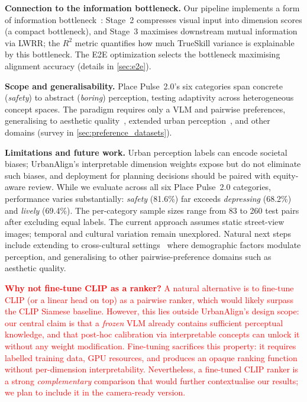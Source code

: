\documentclass[runningheads]{llncs}
\begin{document}
\smallskip\noindent\textbf{Connection to the information bottleneck.}
Our pipeline implements a form of information bottleneck~\cite{tishby2000information}: Stage~2 compresses visual input into dimension scores (a compact bottleneck), and Stage~3 maximises downstream mutual information via LWRR; the $R^{2}$ metric quantifies how much TrueSkill variance is explainable by this bottleneck.
The E2E optimization selects the bottleneck maximising alignment accuracy (details in \cref{sec:e2e}).

\smallskip\noindent\textbf{Scope and generalisability.}
Place Pulse~2.0's six categories span concrete (\emph{safety}) to abstract (\emph{boring}) perception, testing adaptivity across heterogeneous concept spaces.
The paradigm requires only a VLM and pairwise preferences, generalising to aesthetic quality~\cite{murray2012ava}, extended urban perception~\cite{quintana2025specs}, and other domains (survey in \cref{sec:preference_datasets}).

\smallskip\noindent\textbf{Limitations and future work.}
Urban perception labels can encode societal biases; UrbanAlign's interpretable dimension weights expose but do not eliminate such biases, and deployment for planning decisions should be paired with equity-aware review.
While we evaluate across all six Place Pulse~2.0 categories, performance varies substantially: \emph{safety} (81.6\%) far exceeds \emph{depressing} (68.2\%) and \emph{lively} (69.4\%).
The per-category sample sizes range from 83 to 260 test pairs after excluding equal labels.
The current approach assumes static street-view images; temporal and cultural variation remain unexplored.
Natural next steps include extending to cross-cultural settings~\cite{pp2chinese2025,quintana2025specs} where demographic factors modulate perception, and generalising to other pairwise-preference domains such as aesthetic quality.

\textcolor{red}{\smallskip\noindent\textbf{Why not fine-tune CLIP as a ranker?}
A natural alternative is to fine-tune CLIP (or a linear head on top) as a pairwise ranker, which would likely surpass the CLIP Siamese baseline.
However, this lies outside UrbanAlign's design scope: our central claim is that a \emph{frozen} VLM already contains sufficient perceptual knowledge, and that post-hoc calibration via interpretable concepts can unlock it without any weight modification.
Fine-tuning sacrifices this property: it requires labelled training data, GPU resources, and produces an opaque ranking function without per-dimension interpretability.
Nevertheless, a fine-tuned CLIP ranker is a strong \emph{complementary} comparison that would further contextualise our results; we plan to include it in the camera-ready version.}
\end{document}
